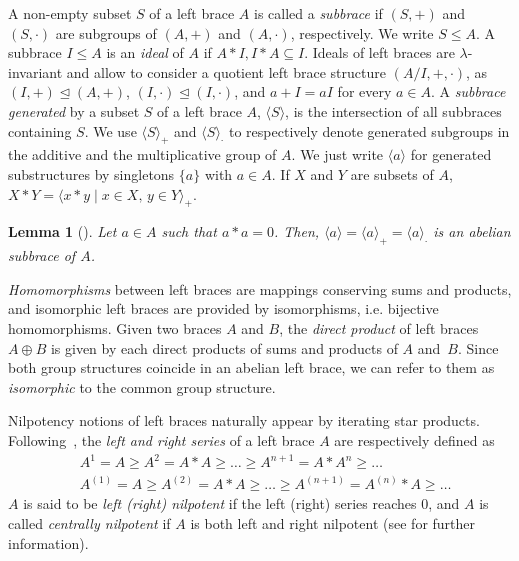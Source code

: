 \documentclass[12pt, a4paper, english]{article}
\newtheorem{lema}[teorema]{Lemma}
\theoremstyle{definition}
\begin{document}
A non-empty subset $S$ of a left brace $A$ is called a \emph{subbrace} if $(S,+)$ and $(S,\cdot)$ are subgroups of $(A,+)$ and $(A,\cdot)$, respectively. We write $S \leq A$. A subbrace $I \leq A$ is an \emph{ideal} of $A$ if $A \ast I, I \ast A \subseteq I$. Ideals of left braces are $\lambda$-invariant and allow to consider a quotient left brace structure $(A/I, +, \cdot)$, as $(I,+)\unlhd (A,+)$, $(I,\cdot)\unlhd (I, \cdot)$, and  $a+I = aI$ for every $a\in A$. A \emph{subbrace generated} by a subset $S$ of a left brace $A$, $\langle S \rangle$, is the intersection of all subbraces containing $S$. We use $\langle S\rangle_+$ and $\langle S \rangle_{\boldsymbol{\cdot}}$ to respectively denote generated subgroups in the additive and the multiplicative group of $A$. We just write $\langle a\rangle$ for generated substructures by singletons $\{a\}$ with $a\in A$. If $X$ and $Y$ are subsets of $A$, $X \ast Y = \langle x \ast y\mid x \in X, \, y \in Y\rangle_+$. 

\begin{lema}[\cite{BallesterEstebanKurdachenkoPerezC-dedekind-leftbraces}]
\label{lema:a·a=0ciclic}
Let   $a \in A$ such that $a\ast a = 0$. Then, $\langle a \rangle = \langle a \rangle_+ = \langle a \rangle_{\boldsymbol{\cdot}}$ is an abelian subbrace of $A$.  
\end{lema}


\emph{Homomorphisms} between left braces are mappings conserving sums and products, and isomorphic left braces are provided by isomorphisms, i.e. bijective homomorphisms. Given two braces $A$ and $B$, the \emph{direct product} of left braces $A \oplus B$ is given by each direct products of sums and products of $A$ and~$B$. Since both group structures coincide in an abelian left brace, we can refer to them as \emph{isomorphic} to the common group structure.

\bigskip

Nilpotency notions of left braces naturally appear by iterating star products. Following~\cite{Rump07}, the \emph{left and right series} of a left brace $A$ are respectively defined as 
\begin{align*}
& A^1 = A  \geq A^2 = A \ast A \geq \ldots \geq A^{n+1} = A \ast A^n \geq \ldots\\
& A^{(1)} = A \geq A^{(2)} = A \ast A \geq \ldots \geq A^{(n+1)} = A^{(n)}\ast A \geq \ldots 
\end{align*}
$A$ is said to be \emph{left (right) nilpotent} if the left (right) series reaches $0$, and $A$ is called \emph{centrally nilpotent} if $A$ is both left and right nilpotent (see  \cite{BallesterEstebanFerraraPerezCTrombetti-arXiv-cent-nilp,BonattoJedlicka23, CedoSmoktunowiczVendramin19} for further information). 
\end{document}
